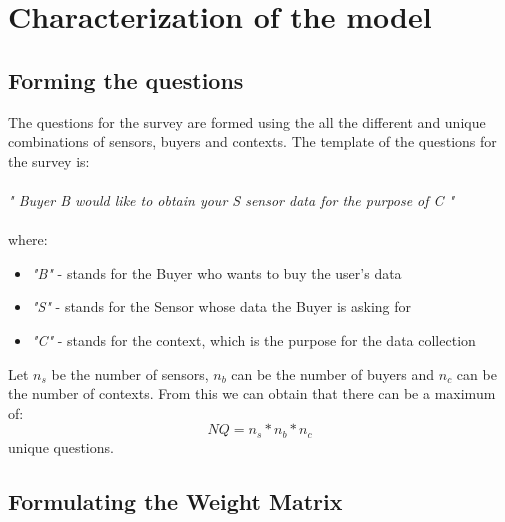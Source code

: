 \section{Characterization of the model}


\subsection{Forming the questions}   \label{question_format}

The questions for the survey are formed using the all the different and unique combinations of sensors, buyers and contexts. The template of the questions for the survey is:\\
\\
{\it " Buyer B would like to obtain your S sensor data for the purpose of C "}\\\\
where:
\begin{itemize}
\item {\it "B"} - stands for the Buyer who wants to buy the user's data
\item {\it "S"} - stands for the Sensor whose data the Buyer is asking for
\item {\it "C"} - stands for the context, which is the purpose for the data collection
\end{itemize}

Let $n_s$ be the number of sensors, $n_b$ can be the number of buyers and $n_c$ can be the number of contexts. From this we
can obtain that there can be a maximum of:
$$NQ = n_s*n_b*n_c$$ 
unique questions.

\subsection{Formulating the Weight Matrix}  \label{weight_matrix_formulation}


